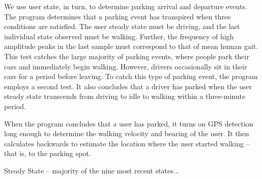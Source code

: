 We use user state, in turn, to determine parking arrival and departure
events. The program determines that a parking event has transpired when
three conditions are satisfied. The user steady state must be driving, and
the last individual state observed must be walking. Further, the frequency
of high amplitude peaks in the last sample must correspond to that of mean
human gait. This test catches the large majority of parking events, where
people park their cars and immediately begin walking. However, drivers
occasionally sit in their cars for a period before leaving. To catch this
type of parking event, the program employs a second test. It also concludes
that a driver has parked when the user steady state transcends from driving
to idle to walking within a three-minute period.

When the program concludes that a user has parked, it turns on GPS detection
long enough to determine the walking velocity and bearing of the user. It
then calculates backwards to estimate the location where the user started
walking – that is, to the parking spot.

Steady State – majority of the nine most recent states...
